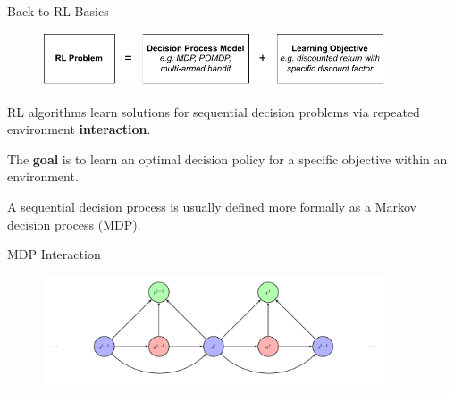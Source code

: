 \begin{frame}{Back to RL Basics}

    \begin{figure}
        \centering
        \includegraphics[width=0.9\textwidth,height=0.4\textheight,keepaspectratio]{images/chapter_2/rl-learning-problem.pdf}
        \label{fig:enter-label}
    \end{figure}

    \blist
        \item RL algorithms learn solutions for sequential decision problems via repeated environment \textbf{interaction}.
        \item The \textbf{goal} is to learn an optimal decision policy for a specific objective within an environment.  
        \item A sequential decision process is usually defined more formally as a Markov decision process (MDP).
    \elist
    
\end{frame}

\begin{frame}{MDP Interaction}
    
    \begin{figure}[htbp]
      \centering
      \includegraphics[width=0.9\textwidth,height=0.9\textheight,keepaspectratio]{figures/1_mdp_diagram_elipses.pdf}
      \label{fig:mdp}
    \end{figure}
    
\end{frame}

